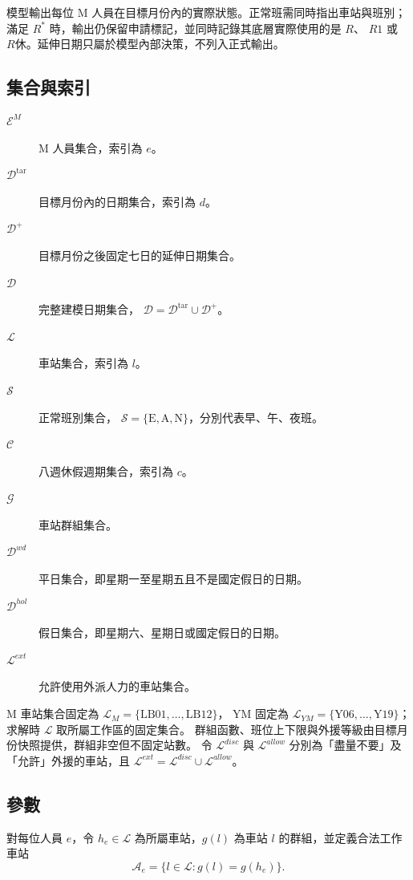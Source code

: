 \documentclass[a4paper,12pt]{article}
\begin{document}
模型輸出每位 M 人員在目標月份內的實際狀態。正常班需同時指出車站與班別；
滿足 \(R^*\) 時，輸出仍保留申請標記，並同時記錄其底層實際使用的是 \(R\)、
\(R1\) 或 \(R休\)。延伸日期只屬於模型內部決策，不列入正式輸出。

\subsection{集合與索引}

\begin{description}
  \item[\(\mathcal{E}^{M}\)] M 人員集合，索引為 \(e\)。
  \item[\(\mathcal{D}^{\mathrm{tar}}\)] 目標月份內的日期集合，索引為 \(d\)。
  \item[\(\mathcal{D}^{+}\)] 目標月份之後固定七日的延伸日期集合。
  \item[\(\mathcal{D}\)] 完整建模日期集合，
    \(\mathcal{D}=\mathcal{D}^{\mathrm{tar}}\cup\mathcal{D}^{+}\)。
  \item[\(\mathcal{L}\)] 車站集合，索引為 \(l\)。
  \item[\(\mathcal{S}\)] 正常班別集合，
    \(\mathcal{S}=\{\mathrm{E},\mathrm{A},\mathrm{N}\}\)，分別代表早、午、夜班。
  \item[\(\mathcal{C}\)] 八週休假週期集合，索引為 \(c\)。
  \item[\(\mathcal{G}\)] 車站群組集合。
  \item[\(\mathcal{D}^{wd}\)] 平日集合，即星期一至星期五且不是國定假日的日期。
  \item[\(\mathcal{D}^{hol}\)] 假日集合，即星期六、星期日或國定假日的日期。
  \item[\(\mathcal{L}^{ext}\)] 允許使用外派人力的車站集合。
\end{description}

M 車站集合固定為 \(\mathcal L_M=\{\mathrm{LB01},\ldots,\mathrm{LB12}\}\)，
YM 固定為 \(\mathcal L_{YM}=\{\mathrm{Y06},\ldots,\mathrm{Y19}\}\)；求解時 \(\mathcal L\)
取所屬工作區的固定集合。
群組函數、班位上下限與外援等級由目標月份快照提供，群組非空但不固定站數。
令 \(\mathcal L^{disc}\) 與 \(\mathcal L^{allow}\) 分別為「盡量不要」及
「允許」外援的車站，且
\(\mathcal L^{ext}=\mathcal L^{disc}\cup\mathcal L^{allow}\)。

\subsection{參數}

對每位人員 \(e\)，令 \(h_e\in\mathcal{L}\) 為所屬車站，\(g(l)\) 為車站
\(l\) 的群組，並定義合法工作車站
\[
  \mathcal{A}_e
  =
  \{l\in\mathcal{L}:g(l)=g(h_e)\}.
\]
\end{document}
